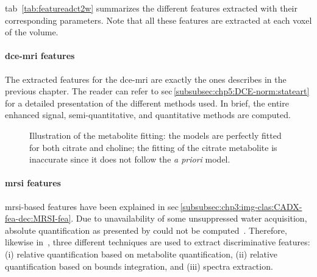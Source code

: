 \Acl{tab}~\ref{tab:featureadct2w} summarizes the different features extracted with their corresponding parameters.
Note that all these features are extracted at each voxel of the volume.

\paragraph{\ac{dce}-\ac{mri} features} The extracted features for the \ac{dce}-\ac{mri} are exactly the ones describes in the previous chapter.
The reader can refer to \ac{sec}\,\ref{subsubsec:chp5:DCE-norm:stateart} for a detailed presentation of the different methods used.
In brief, the entire enhanced signal, semi-quantitative, and quantitative methods are computed. 

\begin{figure}
  \hspace*{\fill}
  \hfill
  \hspace*{\fill}
  \caption[Illustration of the metabolite fitting.]{Illustration of the metabolite fitting:  the models are perfectly fitted for both citrate and choline;  the fitting of the citrate metabolite is inaccurate since it does not follow the \textit{a priori} model.}
  \label{fig:fitmeta}
\end{figure}

\paragraph{\ac{mrsi} features} \ac{mrsi}-based features have been explained in \acs{sec}\,\ref{subsubsec:chp3:img-clas:CADX-fea-dec:MRSI-fea}.
Due to unavailability of some unsuppressed water acquisition, absolute quantification as presented by \citeauthor{trigui2017automatic} could not be computed~\cite{trigui2017automatic}.
Therefore, likewise in~\cite{Parfait2012}, three different techniques are used to extract discriminative features: (i) relative quantification based on metabolite quantification, (ii) relative quantification based on bounds integration, and (iii) spectra extraction.

